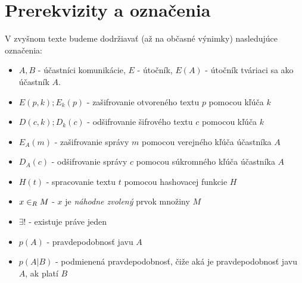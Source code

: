 \section{Prerekvizity a označenia}


V zvyšnom texte budeme dodržiavať (až na občasné výnimky) nasledujúce
označenia:
\begin{itemize}
\item $A,B$ - účastníci komunikácie, $E$ - útočník, $E(A)$ - útočník
            tváriaci sa ako účastník $A$.
\item $E(p,k); E_k(p)$ - zašifrovanie otvoreného textu $p$ pomocou kľúča $k$
\item $D(c,k); D_k(c)$ - odšifrovanie šifrového textu $c$ pomocou kľúča $k$
\item $E_A(m)$ - zašifrovanie správy $m$ pomocou verejného kľúča účastníka $A$
\item $D_A(c)$ - odšifrovanie správy $c$ pomocou súkromného kľúča účastníka $A$
\item $H(t)$ - spracovanie textu $t$ pomocou hashovacej funkcie $H$
\item $x \in_{R} M$ - $x$ je \emph{náhodne zvolený} prvok množiny $M$
\item $\exists !$ - existuje práve jeden
\item $p(A)$ - pravdepodobnosť javu $A$
\item $p(A|B)$ - podmienená pravdepodobnosť, čiže aká je pravdepodobnosť javu $A$, ak platí $B$
\end{itemize}

